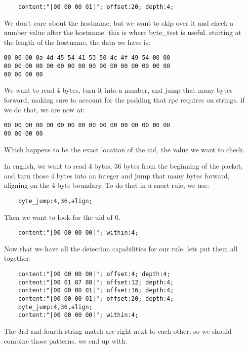 \documentclass[english]{report}
\begin{document}
\begin{verbatim}
    content:"|00 00 00 01|"; offset:20; depth:4;
\end{verbatim}

We don't care about the hostname, but we want to skip over it and check a
number value after the hostname.  this is where byte\_test is useful.  starting
at the length of the hostname, the data we have is:

\begin{verbatim}
00 00 00 0a 4d 45 54 41 53 50 4c 4f 49 54 00 00
00 00 00 00 00 00 00 00 00 00 00 00 00 00 00 00
00 00 00 00
\end{verbatim}

We want to read 4 bytes, turn it into a number, and jump that many bytes
forward, making sure to account for the padding that rpc requires on strings.
if we do that, we are now at:

\begin{verbatim}
00 00 00 00 00 00 00 00 00 00 00 00 00 00 00 00
00 00 00 00 
\end{verbatim}

Which happens to be the exact location of the uid, the value we want to check.

In english, we want to read 4 bytes, 36 bytes from the beginning of the packet, and turn those 4 bytes into an integer and jump that many bytes forward, aligning on the 4 byte boundary.  To do that in a snort rule, we use:

\begin{verbatim}
    byte_jump:4,36,align;
\end{verbatim}

Then we want to look for the uid of 0.

\begin{verbatim}
    content:"|00 00 00 00|"; within:4;
\end{verbatim}

Now that we have all the detection capabilities for our rule, lets put them all together.

\begin{verbatim}
    content:"|00 00 00 00|"; offset:4; depth:4;
    content:"|00 01 87 88|"; offset:12; depth:4;
    content:"|00 00 00 01|"; offset:16; depth:4;
    content:"|00 00 00 01|"; offset:20; depth:4;
    byte_jump:4,36,align;
    content:"|00 00 00 00|"; within:4;
\end{verbatim}

The 3rd and fourth string match are right next to each other, so we should combine those patterns.  we end up with:
\end{document}
